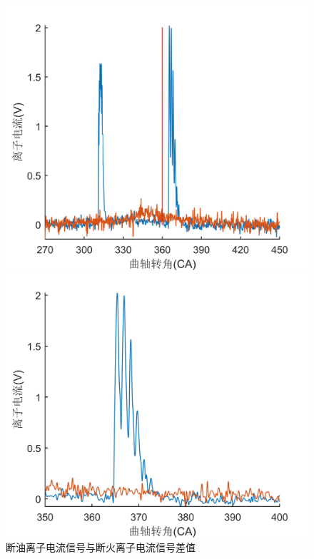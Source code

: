 \begin{figure}[ht]
\begin{minipage}[t]{0.5\linewidth}
	\centering
	\includegraphics[width=\textwidth]{thesis_figure/ion_chapter/diff_dy_dh}
\end{minipage}
\begin{minipage}[t]{0.5\linewidth}
	\centering
	\includegraphics[width=\textwidth]{thesis_figure/ion_chapter/diff_dy_dh_detail}
\end{minipage}
	\caption{断油离子电流信号与断火离子电流信号差值}
	\label{fig:diff_dy_dh}
\end{figure}
